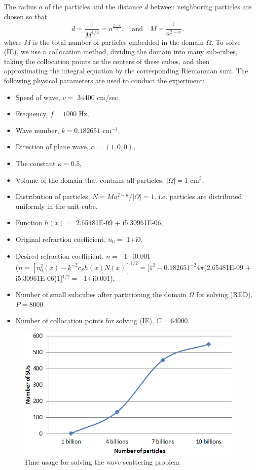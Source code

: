 \documentclass{wap}
\newcommand{\be}{\begin{equation}}
\newcommand{\ee}{\end{equation}}
\begin{document}
The radius $a$ of the particles and the distance $d$ between neighboring particles are chosen so that
\be \label{eq4.3}
    d=\frac{1}{M^{1/3}}=a^{\frac{2-\kappa}{3}}, \quad\text{and}\quad M=\frac{1}{a^{2-\kappa}},
\ee
where $M$ is the total number of particles embedded in the domain $\Omega$. To solve (IE), we use  a collocation method, dividing the domain into many sub-cubes, taking the collocation points as the centers of these cubes, and then approximating the integral equation by the corresponding Riemannian sum. The following physical parameters are used to conduct the experiment:
\begin{itemize}
	\item Speed of wave, $v=$ 34400 cm/sec,
	\item Frequency, $f= 1000$ Hz,
	\item Wave number, $k= 0.182651$ cm$^{-1}$,
	\item Direction of plane wave, $\alpha= (1, 0, 0)$,
	\item The constant $\kappa= 0.5$,
	\item Volume of the domain that contains all particles, $|\Omega|= 1$ cm$^3$,
	\item Distribution of particles, $N=Ma^{2-\kappa}/|\Omega|= 1$, i.e. particles are distributed uniformly in the unit cube,
	\item Function $h(x) =$ 2.65481E-09 + i5.30961E-06,
	\item Original refraction coefficient, $n_0=$ 1+i0,
	\item Desired refraction coefficient, $n =$ -1+i0.001\\
	($n=[n_0^2(x)-k^{-2}c_Sh(x)N(x)]^{1/2} = [1^2-0.182651^{-2}4\pi$(2.65481E-09 + i5.30961E-06)1]$^{1/2} =$ -1+i0.001),
	\item Number of small subcubes after partitioning the domain $\Omega$ for solving (RED), $P=8000$.
	\item Number of collocation points for solving (IE), $C= 64000$.
\end{itemize}
\begin{figure}[htbp]
\centering
\includegraphics[width=0.5\linewidth]{SUs}
\caption{Time usage for solving the wave scattering problem}
\label{fig1}
\end{figure}
\end{document}
